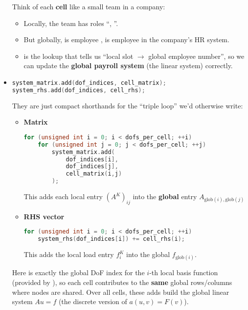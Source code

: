 \begin{itemize}
    \begin{examplebox}
        Think of each \textbf{cell} like a small team in a company:
        \begin{itemize}
            \item Locally, the team has roles ``, ''.
            \item But globally,  is employee ,  is employee  in the company's HR system.
            \item {} is the lookup that tells us ``local slot $\to$ global employee number'', so we can update the \textbf{global payroll system} (the linear system) correctly.
        \end{itemize}
    \end{examplebox}


    \item {}
    \begin{lstlisting}[language=C++]
system_matrix.add(dof_indices, cell_matrix);
system_rhs.add(dof_indices, cell_rhs);\end{lstlisting}
    They are just compact shorthands for the ``triple loop'' we'd otherwise write:
    \begin{itemize}
        \item \textbf{Matrix}
        \begin{lstlisting}[language=C++]
for (unsigned int i = 0; i < dofs_per_cell; ++i)
    for (unsigned int j = 0; j < dofs_per_cell; ++j)
        system_matrix.add(
            dof_indices[i],
            dof_indices[j],
            cell_matrix(i,j)
        );\end{lstlisting}
        This adds each local entry $\left(A^{K}\right)_{ij}$ into the \textbf{global} entry $A_{\text{glob}(i),\text{glob}(j)}$
        \item \textbf{RHS vector}
        \begin{lstlisting}[language=C++]
for (unsigned int i = 0; i < dofs_per_cell; ++i)
    system_rhs(dof_indices[i]) += cell_rhs(i);\end{lstlisting}
        This adds the local load entry $f^{K}_{i}$ into the global $f_{\text{glob}(i)}$.
    \end{itemize}
    Here  is exactly the global DoF index for the $i$-th local basis function (provided by ), so each cell contributes to the \textbf{same} global rows/columns where nodes are shared. Over all cells, these adds build the global linear system $Au=f$ (the discrete version of $a(u,v)=F(v)$).
\end{itemize}

